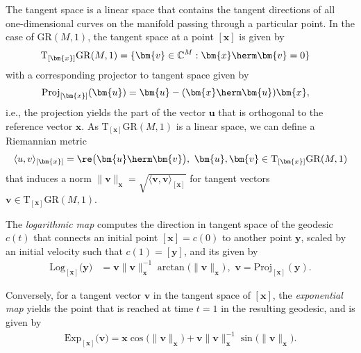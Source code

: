 The tangent space is a linear space that contains the tangent directions of all one-dimensional curves on the manifold passing through a particular point. In the case of $\mathrm{GR}(M,1)$, the tangent space at a point $[\bm{x}]$ is given by
\begin{align}
	\mathrm{T}_{[\bm{x}]}\mathrm{GR}(M,1)&=\{\bm{v}\in\mathbb{C}^{M}: \bm{x}\herm\bm{v}=0\} \label{eqn:grasmann_tangent_space}
\end{align}
with a corresponding projector to tangent space given by 
\begin{align}
	\mathrm{Proj}_{[\bm{x}]}(\bm{u})&=\bm{u}-(\bm{x}\herm\bm{u})\bm{x},\label{eqn:grasmann_proj}
\end{align}
i.e., the projection yields the part of the vector $\bm{u}$ that is orthogonal to the reference vector $\bm{x}$. As  $\mathrm{T}_{[\bm{x}]}\mathrm{GR}(M,1)$ is a linear space, we can define a Riemannian metric 
\begin{equation}
	\langle u,v\rangle_{[\bm{x}]} = \re\big(\bm{u}\herm\bm{v}\big),\,\,\bm{u},\bm{v}\in \mathrm{T}_{[\bm{x}]}\mathrm{GR}(M,1)
\end{equation}
that induces a norm $\|\bm{v}\|_{\bm{x}}=\sqrt{\langle \bm{v},\bm{v}\rangle_{[\bm{x}]}}$ for tangent vectors $\bm{v}\in\mathrm{T}_{[\bm{x}]}\mathrm{GR}(M,1)$. 

The \emph{logarithmic map} computes the direction in tangent space of the geodesic $c(t)$ that connects an initial point $[\bm{x}]=c(0)$ to another point $\bm{y}$, scaled by an initial velocity such that $c(1)=[\bm{y}]$, and its given by 
\begin{align}
	\mathrm{Log}_{[\bm{x}]}\big(\bm{y}\big)&=\bm{v}\|\bm{v}\|_{\bm{x}}^{-1}\arctan\big(\|\bm{v}\|_{\bm{x}}\big)\,,\,\, \bm{v}=\mathrm{Proj}_{[\bm{x}]}(\bm{y}).
\end{align}

Conversely, for a tangent vector $\bm{v}$ in the tangent space of $[\bm{x}]$, the \emph{exponential map} yields the point that is reached at time $t=1$ in the resulting geodesic, and is given by
\begin{align}
	\mathrm{Exp}_{[\bm{x}]}\big(\bm{v}\big)= \bm{x}\cos\big(\|\bm{v}\|_{\bm{x}}\big)+\bm{v}\|\bm{v}\|_{\bm{x}}^{-1}\sin\big(\|\bm{v}\|_{\bm{x}}\big).
\end{align}


